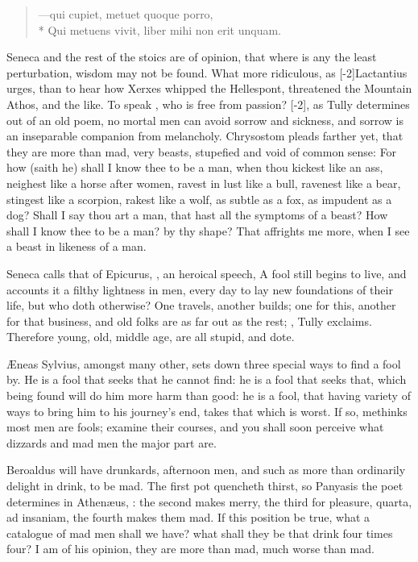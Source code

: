 {\begin{verse}
---\textlatin{qui cupiet, metuet quoque porro,}\\*
\textlatin{Qui metuens vivit, liber mihi non erit unquam.}
\end{verse}

Seneca and the rest of the stoics are of opinion, that where is any the
least perturbation, wisdom may not be found. What more ridiculous, as
[-2\baselineskip]Lactantius urges, than to hear how Xerxes whipped the Hellespont,
threatened the Mountain Athos, and the like. To speak , who is
free from passion? [-2\baselineskip], as Tully determines out of an old poem, no mortal men
can avoid sorrow and sickness, and sorrow is an inseparable companion
from melancholy. Chrysostom pleads farther yet, that they are more
than mad, very beasts, stupefied and void of common sense: For how
(saith he) shall I know thee to be a man, when thou kickest like an
ass, neighest like a horse after women, ravest in lust like a bull,
ravenest like a bear, stingest like a scorpion, rakest like a wolf, as
subtle as a fox, as impudent as a dog? Shall I say thou art a man, that
hast all the symptoms of a beast? How shall I know thee to be a man? by
thy shape? That affrights me more, when I see a beast in likeness of a
man.

Seneca calls that of Epicurus, , an heroical
speech, A fool still begins to live, and accounts it a filthy lightness
in men, every day to lay new foundations of their life, but who doth
otherwise? One travels, another builds; one for this, another for that
business, and old folks are as far out as the rest; , Tully exclaims. Therefore young, old, middle age, are all
stupid, and dote.

\AE{}neas Sylvius, amongst many other, sets down three special ways
to find a fool by. He is a fool that seeks that he cannot find: he is a
fool that seeks that, which being found will do him more harm than
good: he is a fool, that having variety of ways to bring him to his
journey's end, takes that which is worst. If so, methinks most men are
fools; examine their courses, and you shall soon perceive what dizzards
and mad men the major part are.

Beroaldus will have drunkards, afternoon men, and such as more than
ordinarily delight in drink, to be mad. The first pot quencheth thirst,
so Panyasis the poet determines in Athen\ae{}us, : the second makes merry, the third for pleasure, quarta, ad
insaniam, the fourth makes them mad. If this position be true, what a
catalogue of mad men shall we have? what shall they be that drink four
times four?  I am of his opinion, they are more than mad, much worse
than mad.

}
